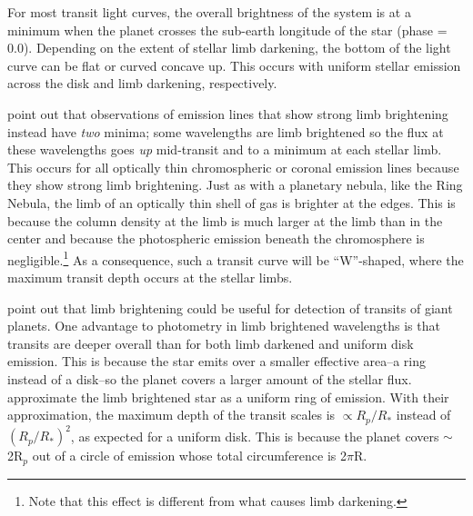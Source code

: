 \documentclass[manuscript]{aastex}
\begin{document}
For most transit light curves, the overall brightness of the system is at a minimum when the planet crosses the sub-earth longitude of the star (phase = 0.0). Depending on the extent of stellar limb darkening, the bottom of the light curve can be flat or curved concave up. This occurs with uniform stellar emission across the disk and limb darkening, respectively.
%

\citet{assef} point out that observations of emission lines that show strong limb brightening instead have {\it two} minima; some
wavelengths are limb brightened so the flux at these wavelengths goes
{\it up} mid-transit and to a minimum at each stellar limb. This occurs for all optically thin
chromospheric or coronal emission lines because they show strong limb brightening. Just as with a planetary
nebula, like the Ring Nebula, the limb of an optically thin shell of
gas is brighter at the edges. This is because the column density at
the limb is much larger at the limb than in the center and because the photospheric emission beneath the chromosphere is negligible.\footnote{Note
that this effect is different from what causes limb darkening.} As a
consequence, such a transit curve will be ``W''-shaped, where the maximum
transit depth occurs at the stellar limbs.

\citet{assef} point out that limb brightening could be
useful for detection of transits of giant planets. One advantage
to photometry in limb brightened wavelengths is that transits are
deeper overall than for both limb darkened and uniform disk
emission. This is because the star emits over a smaller effective area--a ring instead of a disk--so the planet covers a larger amount of the
stellar flux. \citet{assef} approximate the limb brightened
star as a uniform ring of emission. With their approximation, the maximum depth
of the transit scales is  $\propto R_p/R_*$ instead of $(R_p/R_*)^2$,
as expected for a uniform disk. This is because the planet covers $\sim$2R$_p$ out of a circle of emission whose total circumference is 2$\pi$R. 
\end{document}
